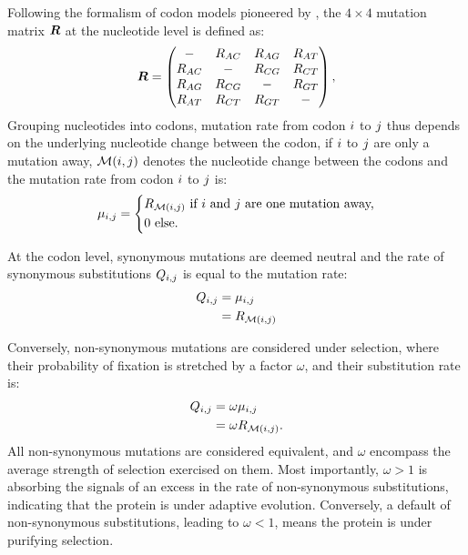 Following the formalism of codon models pioneered by \citet{Muse1994}, the $4 \times 4$ mutation matrix $\bm{R}$ at the nucleotide level is defined as:
\begin{equation}
\label{eq:mutrates}
\bm{R} = \begin{pmatrix}
- & {R_{AC}} & 		{R_{AG}} & 		{R_{AT}} \\
{R_{AC}} & - & {R_{CG}} &		{R_{CT}} \\
{R_{AG}} & 		{R_{CG}} & - & {R_{GT}} \\
{R_{AT}} & 		{R_{CT}} & 		{R_{GT}} & -
\end{pmatrix},
\end{equation}
Grouping nucleotides into codons, mutation rate from \gls{codon} ${i}$ to ${j}$ thus depends on the underlying nucleotide change between the \gls{codon}, if ${i}$ to ${j}$ are only a mutation away, $\mathcal{M}({i}, {j})$ denotes the nucleotide change between the codons and the mutation rate from \gls{codon} ${i}$ to ${j}$ is:
\begin{equation}
\mu_{{i}, {j}} = 
\begin{dcases}
 R_{\mathcal{M}({i}, {j})} \text{ if ${i}$ and ${j}$ are one mutation away,} \\
 0 \text{ else.}
\end{dcases}
\end{equation}

At the codon level, synonymous mutations are deemed neutral and the rate of synonymous substitutions ${Q_{{i}, {j}}}$ is equal to the mutation rate: 
\begin{align}
Q_{{i}, {j}} & = \mu_{{i}, {j}} \\
				  & = R_{\mathcal{M}({i}, {j})}
\end{align}

Conversely, non-synonymous mutations are considered under selection, where their probability of fixation is stretched by a factor $\omega$, and their substitution rate is:
\begin{align}
Q_{{i}, {j}} & = \omega \mu_{{i}, {j}} \\
					& = \omega R_{\mathcal{M}({i}, {j})}.
\end{align}
All non-synonymous mutations are considered equivalent, and $\omega$ encompass the average strength of selection exercised on them.
Most importantly, $\omega>1$ is absorbing the signals of an excess in the rate of non-synonymous substitutions, indicating that the protein is under adaptive evolution.
Conversely, a default of non-synonymous substitutions, leading to $\omega<1$, means the protein is under purifying selection.


